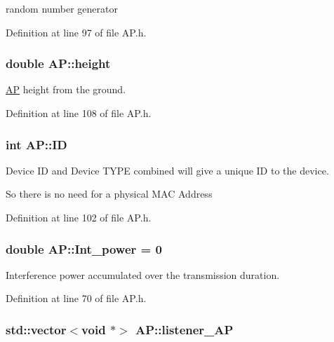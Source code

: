 random number generator 



Definition at line 97 of file A\-P.\-h.

\hypertarget{classAP_a27fec97f7b61e45d1350555cf62535d4}{
\subsubsection[{height}]{\setlength{\rightskip}{0pt plus 5cm}double A\-P\-::height}}\label{classAP_a27fec97f7b61e45d1350555cf62535d4}


\hyperlink{classAP}{A\-P} height from the ground. 



Definition at line 108 of file A\-P.\-h.

\hypertarget{classAP_a5f6f67357a37b369b8967ce354ede5dd}{
\subsubsection[{I\-D}]{\setlength{\rightskip}{0pt plus 5cm}int A\-P\-::\-I\-D}}\label{classAP_a5f6f67357a37b369b8967ce354ede5dd}
Device I\-D and Device T\-Y\-P\-E combined will give a unique I\-D to the device. \par
So there is no need for a physical M\-A\-C Address 

Definition at line 102 of file A\-P.\-h.

\hypertarget{classAP_a6c2c3e61c88d4bba7d949f5663b3ea10}{
\subsubsection[{Int\-\_\-power}]{\setlength{\rightskip}{0pt plus 5cm}double A\-P\-::\-Int\-\_\-power = 0\hspace{0.3cm}{\ttfamily [private]}}}\label{classAP_a6c2c3e61c88d4bba7d949f5663b3ea10}


Interference power accumulated over the transmission duration. 



Definition at line 70 of file A\-P.\-h.

\hypertarget{classAP_ab22d52d2f2568ccb060a3a8b12a670f3}{
\subsubsection[{listener\-\_\-\-A\-P}]{\setlength{\rightskip}{0pt plus 5cm}std\-::vector$<$void $\ast$$>$ A\-P\-::listener\-\_\-\-A\-P}}\label{classAP_ab22d52d2f2568ccb060a3a8b12a670f3}


